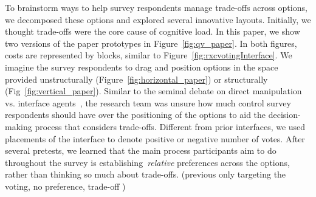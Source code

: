 To brainstorm ways to help survey respondents manage trade-offs across options, we decomposed these options and explored several innovative layouts. Initially, we thought trade-offs were the core cause of cognitive load. In this paper, we show two versions of the paper prototypes in Figure~\ref{fig:qv_paper}. In both figures, costs are represented by blocks, similar to Figure~\ref{fig:rxcvotingInterface}. We imagine the survey respondents to drag and position options in the space provided unstructurally (Figure~\ref{fig:horizontal_paper}) or structurally (Fig~\ref{fig:vertical_paper}). Similar to the seminal debate on direct manipulation vs. interface agents~\cite{shneidermanDirectManipulationVs1997}, the research team was unsure how much control survey respondents should have over the positioning of the options to aid the decision-making process that considers trade-offs. Different from prior interfaces, we used placements of the interface to denote positive or negative number of votes. After several pretests, we learned that the main process participants aim to do throughout the survey is establishing~\textit{relative} preferences across the options, rather than thinking so much about trade-offs. (previous only targeting the voting, no preference, trade-off )

